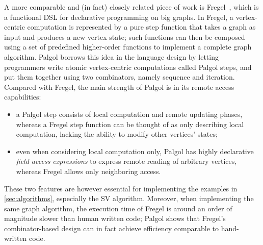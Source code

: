 \documentclass{sokendai_thesis} %
\begin{document}
A more comparable and (in fact) closely related piece of work is Fregel~\cite{fregel}, which is a functional DSL for declarative programming on big graphs.
In Fregel, a vertex-centric computation is represented by a pure step function that takes a graph as input and produces a new vertex state;
such functions can then be composed using a set of predefined higher-order functions to implement a complete graph algorithm.
Palgol borrows this idea in the language design by letting programmers write atomic vertex-centric computations called Palgol steps, and put them together using two combinators, namely sequence and iteration.
Compared with Fregel, the main strength of Palgol is in its remote access capabilities:
\begin{itemize}
 \item a Palgol step consists of local computation and remote updating phases, whereas a Fregel step function can be thought of as only describing local computation, lacking the ability to modify other vertices' states;
 \item even when considering local computation only, Palgol has highly declarative \textit{field access expressions} to express remote reading of arbitrary vertices, whereas Fregel allows only neighboring access.
\end{itemize}
These two features are however essential for implementing the examples in \autoref{sec:algorithms}, especially the SV algorithm.
Moreover, when implementing the same graph algorithm, the execution time of Fregel is around an order of magnitude slower than human written code; Palgol shows that Fregel’s combinator-based design can in fact achieve efficiency comparable to hand-written code.
\end{document}
